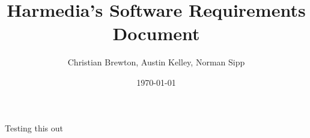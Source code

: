 \documentclass[12pt,a4paper,onesie,titlepage,draft]{article}
\begin{document}
\title{Harmedia's Software Requirements Document}
\author{Christian Brewton, Austin Kelley, Norman Sipp}
\date{\today}
\maketitle
Testing this out
\end{document}
